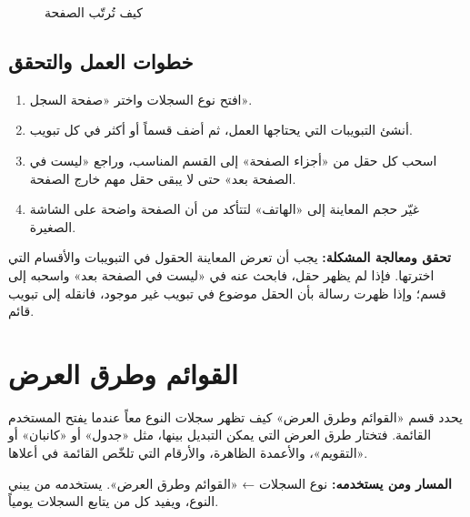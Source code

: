 \begin{figure}[H]
\centering
{}
\rclegend
\caption{كيف تُرتّب الصفحة}
\label{fig:builder-record-page-tree}
\end{figure}

\subsection{خطوات العمل والتحقق}
\begin{enumerate}
\item افتح نوع السجلات واختر «صفحة السجل».
\item أنشئ التبويبات التي يحتاجها العمل، ثم أضف قسماً أو أكثر في كل تبويب.
\item اسحب كل حقل من «أجزاء الصفحة» إلى القسم المناسب، وراجع «ليست في الصفحة بعد» حتى لا يبقى حقل مهم خارج الصفحة.
\item غيّر حجم المعاينة إلى «الهاتف» لتتأكد من أن الصفحة واضحة على الشاشة الصغيرة.
\end{enumerate}

\textbf{تحقق ومعالجة المشكلة:} يجب أن تعرض المعاينة الحقول في التبويبات والأقسام التي اخترتها. فإذا لم يظهر حقل، فابحث عنه في «ليست في الصفحة بعد» واسحبه إلى قسم؛ وإذا ظهرت رسالة بأن الحقل موضوع في تبويب غير موجود، فانقله إلى تبويب قائم.

\clearpage
\section{القوائم وطرق العرض}
\label{sec:builder-feature-lists}

يحدد قسم «القوائم وطرق العرض» كيف تظهر سجلات النوع معاً عندما يفتح المستخدم القائمة. فتختار طرق العرض التي يمكن التبديل بينها، مثل «جدول» أو «كانبان» أو «التقويم»، والأعمدة الظاهرة، والأرقام التي تلخّص القائمة في أعلاها.

\textbf{المسار ومن يستخدمه:} نوع السجلات ← «القوائم وطرق العرض». يستخدمه من يبني النوع، ويفيد كل من يتابع السجلات يومياً.

